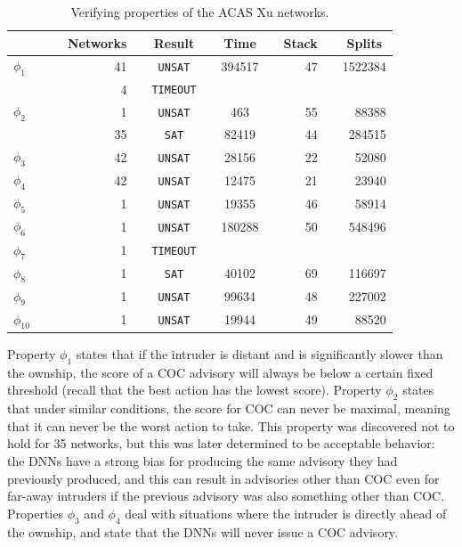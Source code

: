 \documentclass[a4paper]{llncs}
\newcommand{\sat}{\texttt{SAT}}
\newcommand{\unsat}{\texttt{UNSAT}}
\newcommand{\timeout}{\texttt{TIMEOUT}}
\begin{document}
\begin{table}
\centering
\caption{
Verifying properties of the ACAS Xu networks.
}
\begin{tabular}[htp]{lc|crlclclrlr}
  \toprule
  &&& 
     \multicolumn{1}{c}{Networks}
  && 
     \multicolumn{1}{c}{Result}   
  && 
     \multicolumn{1}{c}{Time}
  && 
     \multicolumn{1}{c}{Stack}
  && 
     \multicolumn{1}{c}{Splits}
  \\
  \midrule
  $\phi_1$     &&& 41 && \unsat{} && 394517 && 47 && 1522384 \\
               &&& 4 && \timeout{} &&  &&  &&  \\
  $\phi_2$     &&& 1 && \unsat{} && 463 && 55 && 88388  \\
               &&& 35 && \sat{} && 82419 && 44 && 284515  \\
  $\phi_3$     &&& 42 && \unsat{}  && 28156 && 22 && 52080 \\
  $\phi_4$     &&& 42 && \unsat{}  && 12475 && 21 && 23940 \\
  $\phi_5$     &&& 1 &&  \unsat{}  && 19355 && 46 && 58914 \\
  $\phi_6$     &&& 1 &&  \unsat{}  && 180288 && 50 && 548496 \\
  $\phi_7$     &&& 1 && \timeout{}   &&  &&  &&  \\
  $\phi_8$     &&& 1 && \sat{} && 40102 && 69 && 116697 \\
  $\phi_9$     &&& 1 && \unsat{} && 99634 && 48 && 227002 \\
  $\phi_{10}$    &&& 1 && \unsat{} && 19944 && 49 && 88520 \\
  \bottomrule
\end{tabular}%
\label{table:acasProperties}
\end{table}%

Property $\phi_1$ states that if the intruder is distant and is
significantly slower than the ownship, the score of a COC advisory will
always be below a certain fixed threshold (recall that the best action
has the lowest score). Property $\phi_2$ states
that under similar conditions, the score for COC can never be maximal,
meaning that it can never be the worst action to take.
This property was discovered not to hold for 35 networks, 
but this was later determined to be acceptable behavior:
the DNNs 
have a strong bias for producing the same advisory they
had previously produced, and this
can result in advisories other than COC even for far-away intruders
if the previous advisory was also something other than COC.
Properties $\phi_3$ and $\phi_4$ deal with situations where the
intruder is directly ahead of the ownship, and state that
the DNNs will never issue a COC advisory.
\end{document}
